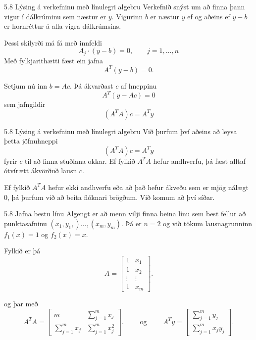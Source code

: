 \begin{frame}{5.8 Lýsing á verkefninu með línulegri algebru} 
Verkefnið snýst um að finna þann vigur í dálkrúminu sem næstur er
$y$. Vigurinn $b$ er næstur $y$ ef og aðeins ef $y-b$ er hornréttur á
alla vigra dálkrúmsins. 


\pause
Þessi skilyrði má fá með innfeldi 
\begin{equation*}
	A_j \cdot (y-b) = 0, \qquad j = 1, \ldots , n
\end{equation*}
Með fylkjarithætti fæst ein jafna
\begin{equation*}
	A^T (y-b) = 0.
\end{equation*}


\pause
\smallskip
Setjum nú inn $b=Ac$. Þá ákvarðast $c$ af hneppinu
\begin{equation*}
A^T(y-Ac) = 0
\end{equation*}
sem jafngildir
\begin{equation*}
	(A^TA)c = A^Ty
\end{equation*}
\end{frame}

\begin{frame}{5.8 Lýsing á verkefninu með línulegri algebru} 
Við þurfum því aðeins að leysa þetta jöfnuhneppi 
\begin{equation*}
	(A^TA)c = A^Ty
\end{equation*}
fyrir $c$ til að
finna stuðlana okkar.   Ef fylkið $A^TA$ hefur andhverfu, þá fæst
alltaf ótvírætt ákvörðuð lausn $c$.

\pause
\smallskip
Ef fylkið $A^TA$  hefur ekki andhverfu eða að það hefur ákveðu sem er
mjög nálægt $0$, þá þurfum við að beita flóknari brögðum.  Við komum
að því síðar.
\end{frame}

\begin{frame}{5.8 Jafna bestu línu}
Algengt er að menn vilji  finna beina línu sem best fellur að 
punktasafninu $(x_1,y_1,)\dots,(x_m,y_m)$.  Þá er 
$n=2$ og við tökum lausnagrunninn $f_1(x)=1$ og $f_2(x)=x$.

\pause
\smallskip
Fylkið er þá
\begin{equation*}
	A = \left[\begin{matrix} 
		1& x_1\\
		1& x_2 \\
		\vdots &\vdots \\
		1& x_m 
	\end{matrix}\right].
\end{equation*}

\pause
\smallskip
og þar með
\begin{equation*}
	A^TA = \left[\begin{matrix} 
		m& \sum_{j=1}^mx_j\\
		\sum_{j=1}^mx_j& \sum_{j=1}^mx_j^2 
	\end{matrix}\right].
\qquad \text{ og } \qquad
	A^Ty = \left[\begin{matrix} 
		 \sum_{j=1}^my_j\\
		\sum_{j=1}^mx_jy_j
	\end{matrix}\right].
\end{equation*}
\end{frame}

